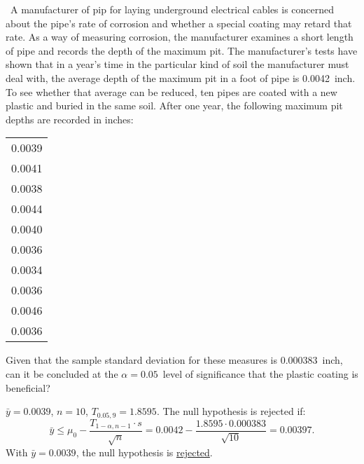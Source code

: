 \begin{problem}
  ~A manufacturer of pip for laying underground electrical cables is concerned about the pipe's rate of corrosion and whether a special coating may retard that rate. As a way of measuring corrosion, the manufacturer examines a short length of pipe and records the depth of the maximum pit. The manufacturer's tests have shown that in a year's time in the particular kind of soil the manufacturer must deal with, the average depth of the maximum pit in a foot of pipe is 0.0042~inch.  To see whether that average can be reduced, ten pipes are coated with a new plastic and buried in the same soil. After one year, the following maximum pit depths are recorded in inches:
  \begin{tabular}{c}
    \toprule
    0.0039 \\
    0.0041 \\
    0.0038 \\
    0.0044 \\
    0.0040 \\
    0.0036 \\
    0.0034 \\
    0.0036 \\
    0.0046 \\
    0.0036 \\\bottomrule
  \end{tabular}
  \noindent
  Given that the sample standard deviation for these measures is 0.000383~inch, can it be concluded at the ${\alpha= 0.05}$~level of significance that the plastic coating is beneficial?
\end{problem}

${\bar{y} = 0.0039}$, ${n= 10}$, ${T_{0.05,9} = 1.8595}$. The null hypothesis is rejected if:
\begin{equation}
  \bar{y} \leq \mu_{0} - \frac{T_{1-\alpha,n-1} \cdot s}{\sqrt{n}} = 0.0042 - \frac{1.8595 \cdot 0.000383}{\sqrt{10}} = 0.00397\text{.}
\end{equation}
\noindent
With ${\bar{y} = 0.0039}$, the null hypothesis is \underline{rejected}.
